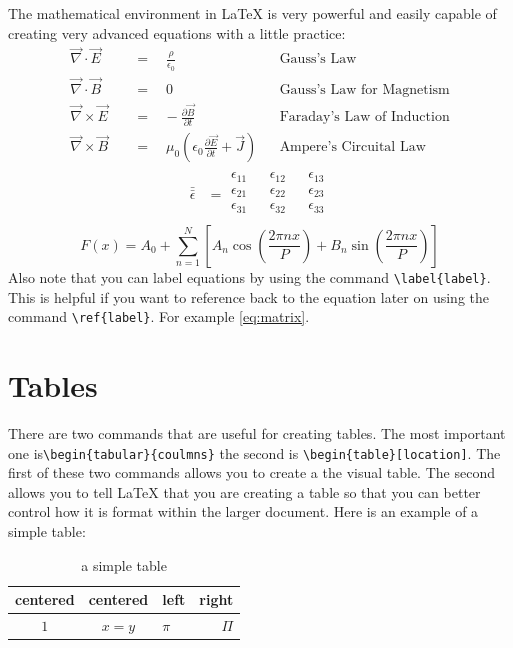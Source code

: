 \documentclass{article} 	%
\numberwithin{equation}{section}
\newcommand{\tensor}[1]{\bar{\bar{#1}}}
\begin{document}
		The mathematical environment in \LaTeX{} is very powerful and easily capable of creating very advanced equations with a little practice:
		\begin{align} 				%
		\vec{\nabla} \cdot \vec{E} \quad &=\quad\frac{\rho}{\epsilon_{0}} &&\text{Gauss's Law} \label{eq:GL}\\  	%
		\vec{\nabla} \cdot \vec{B} \quad &=\quad 0 &&\text{Gauss's Law for Magnetism} \label{eq:GLM}\\
		\vec{\nabla} \times \vec{E} \quad &=\hspace{10pt}-\frac{\partial{\vec{B}}}{\partial{t}} &&\text{Faraday's Law of Induction} \label{eq:FL}\\ 
		\vec{\nabla} \times \vec{B} \quad &=\quad \mu_0 \left( \epsilon_0\frac{\partial{\vec{E}}}{\partial{t}}+\vec{J} \right) &&\text{Ampere's Circuital Law} \label{eq:AL}
		\end{align}
		\begin{align}
		\tensor{\epsilon} &= \begin{matrix} %
			\epsilon_{11} && \epsilon_{12} &&\epsilon_{13} \\
			\epsilon_{21} && \epsilon_{22} &&\epsilon_{23} \\
			\epsilon_{31} && \epsilon_{32} &&\epsilon_{33} \\
		\end{matrix}
		\label{eq:matrix}  %
		\end{align}
		\begin{equation}
		F(x)= A_0 + \sum_{n=1}^N\left[ A_n\cos{\left(\frac{2\pi nx}{P}\right)}+B_n\sin{\left(\frac{2\pi nx}{P}\right)}\right]
		\end{equation}
		Also note that you can label equations by using the command \verb|\label{label}|.  This is helpful if you want to reference back to the equation later on using the command \verb|\ref{label}|.  For example \ref{eq:matrix}.
	\section{Tables}
	There are two commands that are useful for creating tables.  The most important one is\verb|\begin{tabular}{coulmns}| the second is \verb|\begin{table}[location]|.  The first of these two commands allows you to create a the visual table.  The second allows you to tell \LaTeX{} that you are creating a table so that you can better control how it is format within the larger document.  Here is an example of a simple table:
	\begin{table}[h]
		\caption{a simple table}
		\centering
		\begin{tabular}{|c|c|l|r|}
			\hline
			centered & centered & left & right \\
			\hline
			$1$ & $x=y$&$\pi$&$\Pi$\\
			\hline
		\end{tabular}
	\end{table}
\end{document}
